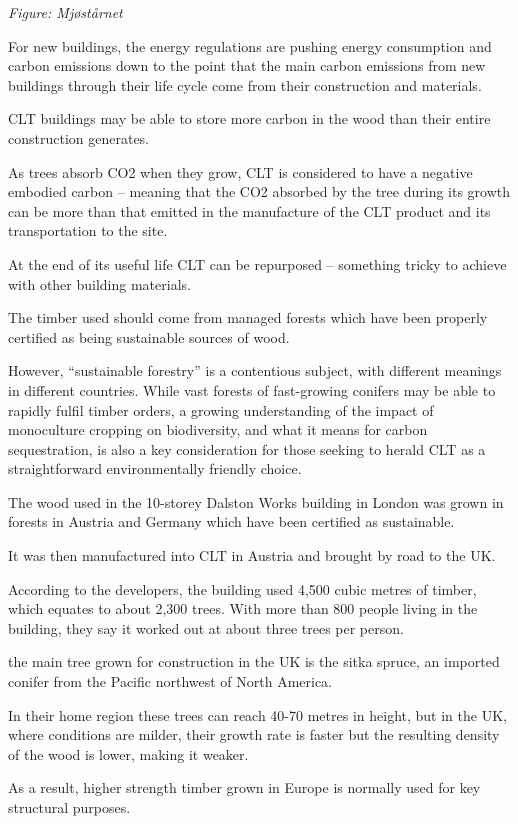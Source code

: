\documentclass[
]{book}
\begin{document}
\emph{Figure: Mjøstårnet}

For new buildings, the energy regulations are pushing energy consumption and carbon emissions down to the point that the main carbon emissions from new buildings through their life cycle come from their construction and materials.

CLT buildings may be able to store more carbon in the wood than their entire construction generates.

As trees absorb CO2 when they grow, CLT is considered to have a negative embodied carbon -- meaning that the CO2 absorbed by the tree during its growth can be more than that emitted in the manufacture of the CLT product and its transportation to the site.

At the end of its useful life CLT can be repurposed -- something tricky to achieve with other building materials.

The timber used should come from managed forests which have been properly certified as being sustainable sources of wood.

However, ``sustainable forestry'' is a contentious subject, with different meanings in different countries. While vast forests of fast-growing conifers may be able to rapidly fulfil timber orders, a growing understanding of the impact of monoculture cropping on biodiversity, and what it means for carbon sequestration, is also a key consideration for those seeking to herald CLT as a straightforward environmentally friendly choice.

The wood used in the 10-storey Dalston Works building in London was grown in forests in Austria and Germany which have been certified as sustainable.

It was then manufactured into CLT in Austria and brought by road to the UK.

According to the developers, the building used 4,500 cubic metres of timber, which equates to about 2,300 trees. With more than 800 people living in the building, they say it worked out at about three trees per person.

the main tree grown for construction in the UK is the sitka spruce, an imported conifer from the Pacific northwest of North America.

In their home region these trees can reach 40-70 metres in height, but in the UK, where conditions are milder, their growth rate is faster but the resulting density of the wood is lower, making it weaker.

As a result, higher strength timber grown in Europe is normally used for key structural purposes.
\end{document}
